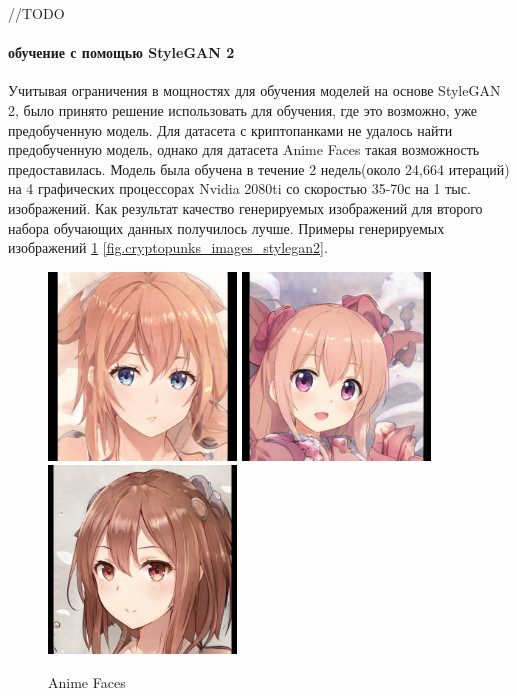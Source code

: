 //TODO

\paragraph{обучение с помощью StyleGAN 2}

Учитывая ограничения в мощностях для обучения моделей на основе StyleGAN 2, было принято решение использовать для обучения, где это возможно, уже предобученную модель. Для датасета с криптопанками не удалось найти предобученную модель, однако для датасета Anime Faces такая возможность предоставилась. Модель была обучена в течение 2 недель(около 24,664 итераций) на 4 графических процессорах Nvidia 2080ti со скоростью 35-70с на 1 тыс. изображений. Как результат качество генерируемых изображений для второго набора обучающих данных получилось лучше.
Примеры генерируемых изображений {\color{blue} \ref{fig.anime_girls_stylegan2}} {\color{blue} \ref{fig.cryptopunks_images_stylegan2}}.

\begin{figure}
    \centering
    \includegraphics[height=50mm, width=.3\textwidth]{fig/anime_girl_seed0025.png}\hfill
    \includegraphics[height=50mm, width=.3\textwidth]{fig/anime_girl_seed0090.png}\hfill
    \includegraphics[height=50mm, width=.3\textwidth]{fig/anime_girl_seed0100.png}
    \caption{Anime Faces}
    \label{fig.anime_girls_stylegan2}
\end{figure}

